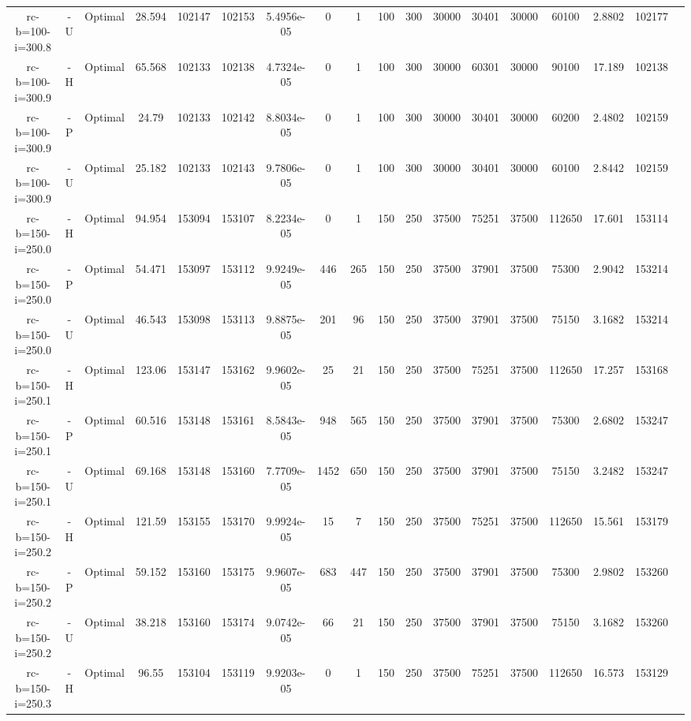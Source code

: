 \documentclass[landscape, a4paper]{article}
\begin{document}
\begin{center}
\begin{tabular}{@{}cccccccccccccccccc@{}}
rc-b=100-i=300.8 & -U & Optimal & 28.594 & 102147 & 102153 & 5.4956e-05 & 0 & 1 & 100 & 300 & 30000 & 30401 & 30000 & 60100 & 2.8802 & 102177 & \\
rc-b=100-i=300.9 & -H & Optimal & 65.568 & 102133 & 102138 & 4.7324e-05 & 0 & 1 & 100 & 300 & 30000 & 60301 & 30000 & 90100 & 17.189 & 102138 & \\
rc-b=100-i=300.9 & -P & Optimal & 24.79 & 102133 & 102142 & 8.8034e-05 & 0 & 1 & 100 & 300 & 30000 & 30401 & 30000 & 60200 & 2.4802 & 102159 & \\
rc-b=100-i=300.9 & -U & Optimal & 25.182 & 102133 & 102143 & 9.7806e-05 & 0 & 1 & 100 & 300 & 30000 & 30401 & 30000 & 60100 & 2.8442 & 102159 & \\
rc-b=150-i=250.0 & -H & Optimal & 94.954 & 153094 & 153107 & 8.2234e-05 & 0 & 1 & 150 & 250 & 37500 & 75251 & 37500 & 112650 & 17.601 & 153114 & \\
rc-b=150-i=250.0 & -P & Optimal & 54.471 & 153097 & 153112 & 9.9249e-05 & 446 & 265 & 150 & 250 & 37500 & 37901 & 37500 & 75300 & 2.9042 & 153214 & \\
rc-b=150-i=250.0 & -U & Optimal & 46.543 & 153098 & 153113 & 9.8875e-05 & 201 & 96 & 150 & 250 & 37500 & 37901 & 37500 & 75150 & 3.1682 & 153214 & \\
rc-b=150-i=250.1 & -H & Optimal & 123.06 & 153147 & 153162 & 9.9602e-05 & 25 & 21 & 150 & 250 & 37500 & 75251 & 37500 & 112650 & 17.257 & 153168 & \\
rc-b=150-i=250.1 & -P & Optimal & 60.516 & 153148 & 153161 & 8.5843e-05 & 948 & 565 & 150 & 250 & 37500 & 37901 & 37500 & 75300 & 2.6802 & 153247 & \\
rc-b=150-i=250.1 & -U & Optimal & 69.168 & 153148 & 153160 & 7.7709e-05 & 1452 & 650 & 150 & 250 & 37500 & 37901 & 37500 & 75150 & 3.2482 & 153247 & \\
rc-b=150-i=250.2 & -H & Optimal & 121.59 & 153155 & 153170 & 9.9924e-05 & 15 & 7 & 150 & 250 & 37500 & 75251 & 37500 & 112650 & 15.561 & 153179 & \\
rc-b=150-i=250.2 & -P & Optimal & 59.152 & 153160 & 153175 & 9.9607e-05 & 683 & 447 & 150 & 250 & 37500 & 37901 & 37500 & 75300 & 2.9802 & 153260 & \\
rc-b=150-i=250.2 & -U & Optimal & 38.218 & 153160 & 153174 & 9.0742e-05 & 66 & 21 & 150 & 250 & 37500 & 37901 & 37500 & 75150 & 3.1682 & 153260 & \\
rc-b=150-i=250.3 & -H & Optimal & 96.55 & 153104 & 153119 & 9.9203e-05 & 0 & 1 & 150 & 250 & 37500 & 75251 & 37500 & 112650 & 16.573 & 153129 & \\

\end{tabular}
\end{center}
\end{document}
